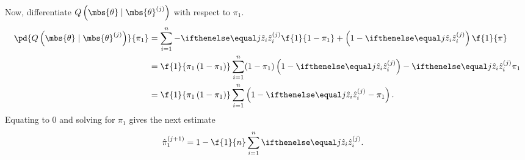 Now, differentiate $Q\left(\mbs{\theta}\mid\mbs{\theta}^{(j)}\right)$ with respect to $\pi_{1}$.
\begin{align}
    \pd{
        Q\left( \mbs{\theta}\mid\mbs{\theta}^{(j)} \right)
    }{
        \pi_{1}
    }
    &=
    \sum_{i=1}^{n}-\zhat[j]{i}\f{1}{1-\pi_{1}} + \left(1-\zhat[j]{i}\right)\f{1}{ \pi}\\
    &=
    \f{1}{\pi_{1}\left( 1-\pi_{1} \right)}\sum_{i=1}^{n} (1-\pi_{1})\left(1-\zhat[j]{i}\right) -\zhat[j]{i}\pi_{1}\\
    &=
    \f{1}{\pi_{1}\left( 1-\pi_{1} \right)}\sum_{i=1}^{n}\left(1 -\zhat[j]{i} - \pi_{1}\right).
\end{align}
Equating to $0$ and solving for $\pi_{1}$ gives the next estimate
\begin{align}
    \hat{\pi}_{1}^{(j+1)} &= 1 - \f{1}{n}\sum_{i=1}^{n}\zhat[j]{i}.
\end{align}

